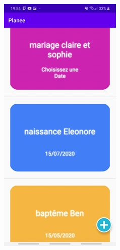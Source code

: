 \documentclass[12pt,a4paper]{report}
\begin{document}
\begin{flushleft}
\begin{figure}[!h]
    \begin{subfigure}[b]{0.3\textwidth}
        \includegraphics[width=\textwidth]{HomeWEvents2}

\end{subfigure}
\end{figure}
\end{flushleft}
\end{document}
